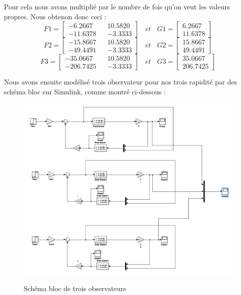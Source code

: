 \par Pour cela nous avons multiplié par le nombre de fois qu'on veut les valeurs propres. Nous obtenon donc ceci :
$$F1 = \begin{bmatrix}-6.2667 && 10.5820 \\ -11.6378 && -3.3333\end{bmatrix}~~~~et~~~~G1 = \begin{bmatrix}6.2667 \\ 11.6378\end{bmatrix}$$
$$F2 = \begin{bmatrix}-15.8667 && 10.5820 \\ -49.4491 && -3.3333\end{bmatrix}~~~~et~~~~G2 = \begin{bmatrix}15.8667 \\ 49.4491\end{bmatrix}$$
$$F3 = \begin{bmatrix}-35.0667 && 10.5820 \\ -206.7425 && -3.3333\end{bmatrix}~~~~et~~~~G3 = \begin{bmatrix}35.0667 \\ 206.7425\end{bmatrix}$$
\par Nous avons ensuite modélisé trois observateur pour nos trois rapidité par des schéma bloc sur Simulink, comme montré ci-dessous :
\begin{figure}[h!]
\centering
\includegraphics[scale = 0.7]{3OBS.JPG}\\[0.7 cm] 
\caption{Schéma bloc de trois observateurs}
\end{figure}
